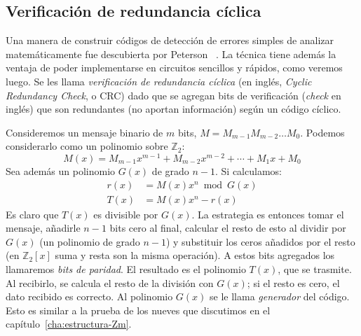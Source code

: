 \subsection{Verificación de redundancia cíclica}
\label{sec:CRC}

  Una manera de construir códigos de detección de errores
  simples de analizar matemáticamente
  fue descubierta por Peterson~%
    \cite{peterson61:_CRC}.
  La técnica tiene además la ventaja
  de poder implementarse en circuitos sencillos y rápidos,
  como veremos luego.
  Se les llama \emph{verificación de redundancia cíclica}
  (en inglés,
   \emph{\foreignlanguage{english}{Cyclic Redundancy Check}},
   o CRC)
  dado que se agregan bits de verificación
  (\emph{\foreignlanguage{english}{check}} en inglés)
  que son redundantes
  (no aportan información)
  según un código cíclico.

  Consideremos un mensaje binario de \(m\) bits,
  \(M = M_{m - 1} M_{m - 2} \dotso M_0\).
  Podemos considerarlo como un polinomio sobre \(\mathbb{Z}_2\):%
  \begin{equation*}
    M(x)
      = M_{m - 1} x^{m - 1}
	 + M_{m - 2} x^{m - 2}
	 + \dotsb
	 + M_1 x
	 + M_0
  \end{equation*}
  Sea además un polinomio \(G(x)\) de grado \(n - 1\).
  Si calculamos:
  \begin{align*}
    r(x)
      &= M(x) x^n \bmod G(x) \\
    T(x)
      &= M(x) x^n - r(x)
  \end{align*}
  Es claro que \(T(x)\) es divisible por \(G(x)\).
  La estrategia es entonces tomar el mensaje,%
  añadirle \(n - 1\) bits cero al final,
  calcular el resto de esto al dividir por \(G(x)\)
  (un polinomio de grado \(n - 1\))
  y substituir los ceros añadidos por el resto
  (en \(\mathbb{Z}_2[x]\) suma y resta son la misma operación).
  A estos bits agregados los llamaremos \emph{bits de paridad}.
  El resultado es el polinomio \(T(x)\),
  que se trasmite.
  Al recibirlo,
  se calcula el resto de la división con \(G(x)\);
  si el resto es cero,
  el dato recibido es correcto.
  Al polinomio \(G(x)\) se le llama \emph{generador} del código.%
  Esto es similar a la prueba de los nueves
  que discutimos en el capítulo~\ref{cha:estructura-Zm}.

